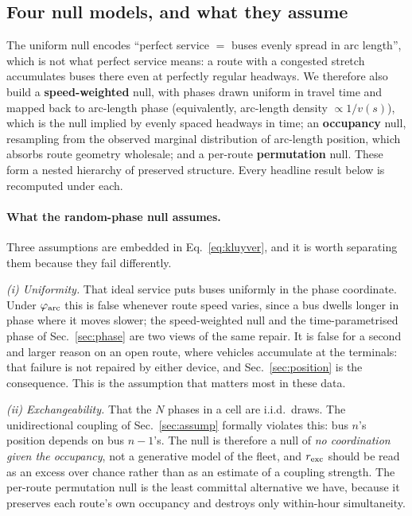\documentclass[9pt,twocolumn,twoside]{opticajnl}
\begin{document}
\subsection{Four null models, and what they assume}\label{sec:nullmodels}

The uniform null encodes ``perfect service $=$ buses evenly spread in arc length'', which is not
what perfect service means: a route with a congested stretch accumulates buses there even at
perfectly regular headways. We therefore also build a \textbf{speed-weighted} null, with phases
drawn uniform in travel time and mapped back to arc-length phase (equivalently, arc-length
density $\propto 1/v(s)$), which is the null implied by evenly spaced headways in time; an
\textbf{occupancy} null, resampling from the observed marginal distribution of arc-length
position, which absorbs route geometry wholesale; and a per-route \textbf{permutation} null.
These form a nested hierarchy of preserved structure. Every headline result below is recomputed
under each.

\paragraph{What the random-phase null assumes.} Three assumptions are embedded in
Eq.~\eqref{eq:kluyver}, and it is worth separating them because they fail differently.

\emph{(i) Uniformity.} That ideal service puts buses uniformly in the phase coordinate. Under
$\varphi_{\rm arc}$ this is false whenever route speed varies, since a bus dwells longer in
phase where it moves slower; the speed-weighted null and the time-parametrised phase of
Sec.~\ref{sec:phase} are two views of the same repair. It is false for a second and larger
reason on an open route, where vehicles accumulate at the terminals: that failure is not
repaired by either device, and Sec.~\ref{sec:position} is the consequence. This is the
assumption that matters most in these data.

\emph{(ii) Exchangeability.} That the $N$ phases in a cell are i.i.d.\ draws. The
unidirectional coupling of Sec.~\ref{sec:assump} formally violates this: bus $n$'s position
depends on bus $n-1$'s. The null is therefore a null of \emph{no coordination given the
occupancy}, not a generative model of the fleet, and $r_{\rm exc}$ should be read as an excess
over chance rather than as an estimate of a coupling strength. The per-route permutation null
is the least committal alternative we have, because it preserves each route's own occupancy and
destroys only within-hour simultaneity.
\end{document}
